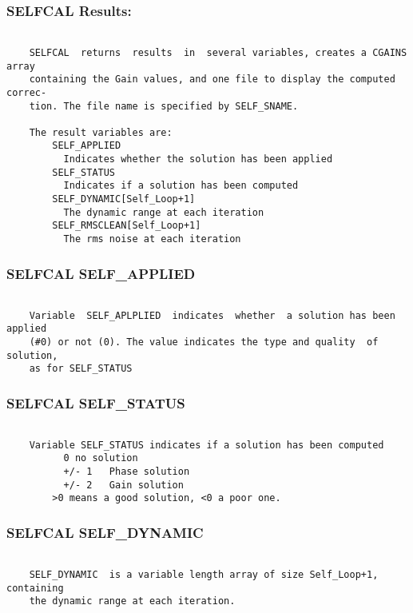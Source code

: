 \subsubsection{SELFCAL Results:}
\begin{verbatim}

    SELFCAL  returns  results  in  several variables, creates a CGAINS array
    containing the Gain values, and one file to display the computed correc-
    tion. The file name is specified by SELF_SNAME.

    The result variables are:
        SELF_APPLIED
          Indicates whether the solution has been applied
        SELF_STATUS
          Indicates if a solution has been computed
        SELF_DYNAMIC[Self_Loop+1]
          The dynamic range at each iteration
        SELF_RMSCLEAN[Self_Loop+1]
          The rms noise at each iteration
\end{verbatim}
\subsubsection{SELFCAL SELF\_APPLIED}
\begin{verbatim}

    Variable  SELF_APLPLIED  indicates  whether  a solution has been applied
    (#0) or not (0). The value indicates the type and quality  of  solution,
    as for SELF_STATUS

\end{verbatim}
\subsubsection{SELFCAL SELF\_STATUS}
\begin{verbatim}

    Variable SELF_STATUS indicates if a solution has been computed
          0 no solution
          +/- 1   Phase solution
          +/- 2   Gain solution
        >0 means a good solution, <0 a poor one.
\end{verbatim}
\subsubsection{SELFCAL SELF\_DYNAMIC}
\begin{verbatim}

    SELF_DYNAMIC  is a variable length array of size Self_Loop+1, containing
    the dynamic range at each iteration.

\end{verbatim}
